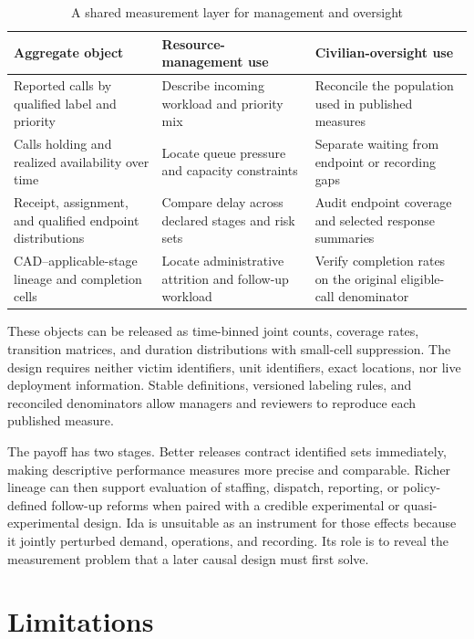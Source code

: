 \documentclass[11pt]{article}
\begin{document}
\begin{table}[H]
\centering
\caption{A shared measurement layer for management and oversight}
\label{tab:allocation_oversight}
\begin{tabularx}{\textwidth}{@{}>{\raggedright\arraybackslash}p{3.05cm} X X@{}}
\toprule
Aggregate object & Resource-management use & Civilian-oversight use \\
\midrule
Reported calls by qualified label and priority & Describe incoming workload and priority mix & Reconcile the population used in published measures \\
\addlinespace
Calls holding and realized availability over time & Locate queue pressure and capacity constraints & Separate waiting from endpoint or recording gaps \\
\addlinespace
Receipt, assignment, and qualified endpoint distributions & Compare delay across declared stages and risk sets & Audit endpoint coverage and selected response summaries \\
\addlinespace
CAD--applicable-stage lineage and completion cells & Locate administrative attrition and follow-up workload & Verify completion rates on the original eligible-call denominator \\
\bottomrule
\end{tabularx}
\end{table}

These objects can be released as time-binned joint counts, coverage rates, transition matrices, and duration distributions with small-cell suppression. The design requires neither victim identifiers, unit identifiers, exact locations, nor live deployment information. Stable definitions, versioned labeling rules, and reconciled denominators allow managers and reviewers to reproduce each published measure.

The payoff has two stages. Better releases contract identified sets immediately, making descriptive performance measures more precise and comparable. Richer lineage can then support evaluation of staffing, dispatch, reporting, or policy-defined follow-up reforms when paired with a credible experimental or quasi-experimental design. Ida is unsuitable as an instrument for those effects because it jointly perturbed demand, operations, and recording. Its role is to reveal the measurement problem that a later causal design must first solve.

\section{Limitations}
\end{document}
